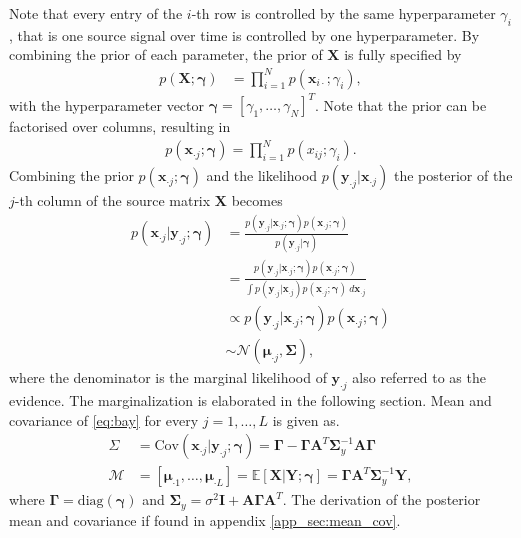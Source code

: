 Note that every entry of the $i$-th row is controlled by the same hyperparameter $\gamma_i$, that is one source signal over time is controlled by one hyperparameter. 
By combining the prior of each parameter, the prior of $\textbf{X}$ is fully specified by 
\begin{align*}
p (\mathbf{X} ; \boldsymbol{\gamma}) &= \prod_{i=1}^N p (\mathbf{x}_{i \cdot} ; \gamma_i),
\end{align*}
with the hyperparameter vector $\boldsymbol{\gamma} = [\gamma_1, \dots, \gamma_N]^T$. Note that the prior can be factorised over columns, resulting in 
\begin{align*}
p\left(\textbf{x}_{\cdot j};\boldsymbol{\gamma}\right) = \prod_{i=1}^{N}p\left( x_{ij};\gamma_{i}\right).
\end{align*} 
Combining the prior $p\left(\textbf{x}_{\cdot j};\boldsymbol{\gamma}\right)$ and the likelihood $p(\mathbf{y}_{\cdot j} \vert \mathbf{x}_{\cdot j})$ the posterior of the $j$-th column of the source matrix $\mathbf{X}$ becomes
\begin{align}
p(\mathbf{x}_{\cdot j} \vert \mathbf{y}_{\cdot j} ; \boldsymbol{\gamma}) &= \frac{p(\mathbf{y}_{\cdot j} | \mathbf{x}_{\cdot j} ; \boldsymbol{\gamma}) p(\mathbf{x}_{\cdot j} ; \boldsymbol{\gamma})}{p(\mathbf{y}_{\cdot j} | \boldsymbol{\gamma})} \nonumber \\
&= \frac{p(\mathbf{y}_{\cdot j} | \mathbf{x}_{\cdot j} ; \boldsymbol{\gamma}) p(\mathbf{x}_{\cdot j} ; \boldsymbol{\gamma})}{\int p(\mathbf{y}_{\cdot j} | \mathbf{x}_{\cdot j}) p(\mathbf{x}_{\cdot j} ; \boldsymbol{\gamma}) \ d \mathbf{x}_{\cdot j}} \nonumber \\ 
&\propto p(\mathbf{y}_{\cdot j} | \mathbf{x}_{\cdot j} ; \boldsymbol{\gamma}) p(\mathbf{x}_{\cdot j} ; \boldsymbol{\gamma}) \nonumber \\
&\sim \mathcal{N}(\boldsymbol{\mu}_{\cdot j}, \boldsymbol{\Sigma}),\label{eq:bay}
\end{align}
where the denominator is the marginal likelihood of $\mathbf{y}_{\cdot j}$ also referred to as the evidence. The marginalization is elaborated in the following section. Mean and covariance of \eqref{eq:bay} for every $j = 1, \dots, L$ is given as.
\begin{align}
\Sigma &= \text{Cov}(\mathbf{x}_{\cdot j} \vert \mathbf{y}_{\cdot j} ; \boldsymbol{\gamma}) = \boldsymbol{\Gamma} - \boldsymbol{\Gamma} \mathbf{A}^T \boldsymbol{\Sigma}_y^{-1} \mathbf{A} \boldsymbol{\Gamma} \label{eq:moments1} \\
\mathcal{M} &= [\boldsymbol{\mu}_{\cdot 1}, \dots, \boldsymbol{\mu}_{\cdot L}] = \mathbb{E}[\mathbf{X} \vert \mathbf{Y} ; \boldsymbol{\gamma}] = \boldsymbol{\Gamma} \mathbf{A}^T \boldsymbol{\Sigma}_y^{-1} \mathbf{Y}, \label{eq:moments2} 
\end{align}
where $\boldsymbol{\Gamma} = \text{diag}(\boldsymbol{\gamma})$ and $\boldsymbol{\Sigma}_y = \sigma^2 \mathbf{I} + \mathbf{A} \boldsymbol{\Gamma} \mathbf{A}^T$. The derivation of the posterior mean and covariance if found in appendix \ref{app_sec:mean_cov}.   

